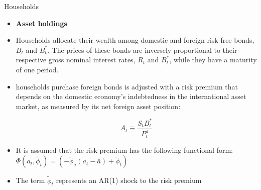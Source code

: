\documentclass[9pt]{beamer}
\let\olditem\item
\renewcommand{\item}{%
\olditem\vspace{\fill}}
\begin{document}
\begin{frame}{Households}
\begin{itemize}
    \item \textbf{Asset holdings}

    \item  Households allocate their wealth among domestic and foreign risk-free bonds, $B_t$ and $B_t^{*}$. The prices of these bonds are inversely proportional to their respective gross nominal interest rates, $R_t$ and $B_t^{*}$, while they have a maturity of one period. 
    \item households purchase foreign bonds is adjusted with a risk premium that depends on the domestic economy’s indebtedness in the international asset market, as measured by its net foreign asset position:
    
    $$A_{t} \equiv \frac{S_{t} B_{t}^{*}}{P_{t}^{d}}$$
    
    \item It is assumed that the risk premium has the following functional form: $\Phi(a_t,\tilde{\phi}_t) =
    \left(-\widetilde{\phi}_{a}\left(a_{t}-\bar{a}\right)+\tilde{\phi}_{t}\right) $ 
    
    \item The term $\tilde{\phi}_{t}$ represents an AR(1) shock to the risk premium
    
\end{itemize}

\end{frame}
\end{document}
